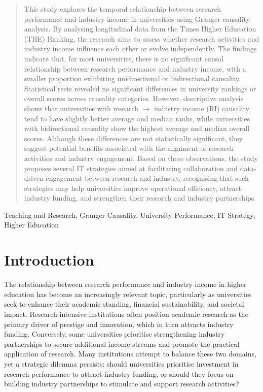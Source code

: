 \documentclass[a4paper, conference]{IEEEtran}
\begin{document}
\newcommand{\al}[1]{{\textbf{\color{blue} Al: #1}}}

\maketitle

\begin{abstract}
This study explores the temporal relationship between research performance and industry income in universities using Granger causality analysis. By analysing longitudinal data from the Times Higher Education (THE) Ranking, the research aims to assess whether research activities and industry income influence each other or evolve independently. The findings indicate that, for most universities, there is no significant causal relationship between research performance and industry income, with a smaller proportion exhibiting unidirectional or bidirectional causality. Statistical tests revealed no significant differences in university rankings or overall scores across causality categories. However, descriptive analysis shows that universities with research $\rightarrow$ industry income (RI) causality tend to have slightly better average and median ranks, while universities with bidirectional causality show the highest average and median overall scores. Although these differences are not statistically significant, they suggest potential benefits associated with the alignment of research activities and industry engagement. Based on these observations, the study proposes several IT strategies aimed at facilitating collaboration and data-driven engagement between research and industry, recognising that such strategies may help universities improve operational efficiency, attract industry funding, and strengthen their research and industry partnerships.
\end{abstract}

\begin{IEEEkeywords}
Teaching and Research, Granger Causality, University Performance, IT Strategy, Higher Education
\end{IEEEkeywords}


\section{Introduction}
\label{sec:introduction}

The relationship between research performance and industry income in higher education has become an increasingly relevant topic, particularly as universities seek to enhance their academic standing, financial sustainability, and societal impact. Research-intensive institutions often position academic research as the primary driver of prestige and innovation, which in turn attracts industry funding. Conversely, some universities prioritise strengthening industry partnerships to secure additional income streams and promote the practical application of research. Many institutions attempt to balance these two domains, yet a strategic dilemma persists: should universities prioritise investment in research performance to attract industry funding, or should they focus on building industry partnerships to stimulate and support research activities?
\end{document}
